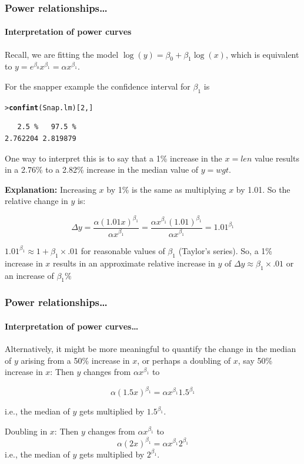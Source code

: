 \documentclass{beamer}\usepackage[]{graphicx}\usepackage[]{xcolor}
\makeatletter
\newcommand{\hlnum}[1]{\textcolor[rgb]{0.686,0.059,0.569}{#1}}%
\newcommand{\hlstd}[1]{\textcolor[rgb]{0.345,0.345,0.345}{#1}}%
\newcommand{\hlkwd}[1]{\textcolor[rgb]{0.737,0.353,0.396}{\textbf{#1}}}%
\newenvironment{kframe}{%
 \def\at@end@of@kframe{}%
 \ifinner\ifhmode%
  \def\at@end@of@kframe{\end{minipage}}%
  \begin{minipage}{\columnwidth}%
 \fi\fi%
 \def\FrameCommand##1{\hskip\@totalleftmargin \hskip-\fboxsep
 \colorbox{shadecolor}{##1}\hskip-\fboxsep
     \hskip-\linewidth \hskip-\@totalleftmargin \hskip\columnwidth}%
 \MakeFramed {\advance\hsize-\width
   \@totalleftmargin\z@ \linewidth\hsize
   \@setminipage}}%
 {\par\unskip\endMakeFramed%
 \at@end@of@kframe}
\newenvironment{knitrout}{}{} %
\makeatother
\begin{document}
\begin{frame}[fragile]
\frametitle{Power relationships\ldots}
\framesubtitle{Interpretation of power curves}
Recall, we are fitting the model 
$\log(y)=\beta_0+\beta_1 \log(x)$, which is equivalent to
$y=e^{\beta_0}x^{\beta_1} =\alpha x^{\beta_1}$.

\medskip

For the snapper example the confidence interval for $\beta_1$ is 
\begin{knitrout}\scriptsize
{}\color{fgcolor}\begin{kframe}
\begin{alltt}
\hlstd{> }\hlkwd{confint}\hlstd{(Snap.lm)[}\hlnum{2}\hlstd{,]}
\end{alltt}
\begin{verbatim}
   2.5 %   97.5 % 
2.762204 2.819879 
\end{verbatim}
\end{kframe}
\end{knitrout}

One way to interpret this is to say that a 1\% increase in the $x=len$ value 
results in a 2.76\% to a 2.82\% increase in the median value of $y=wgt$.

\medskip

\textbf{Explanation:} Increasing $x$ by 1\% is the same as multiplying $x$ by 1.01.
So the  relative change in $y$ is: 

\vspace{-0.5em}

\[
\Delta y=\frac{\alpha (1.01x)^{\beta_1}}{\alpha x^{\beta_1}}
=\frac{\alpha x^{\beta_1}(1.01)^{\beta_1}}{\alpha x^{\beta_1}}=1.01^{\beta_1}
\]

\vspace{-1em}

$1.01^{\beta_1}\approx 1+\beta_1\times .01$ for reasonable values of $\beta_1$  (Taylor's series).
So, a 1\% increase in $x$ results in an approximate relative increase in $y$ of  $\Delta y\approx \beta_1\times .01$ or an increase of $\beta_1\%$
\end{frame}


\begin{frame}[fragile]
\frametitle{Power relationships\ldots}
\framesubtitle{Interpretation of power curves\ldots}
Alternatively, it might be more meaningful to quantify the change in the median of $y$ arising from a 50\% increase in $x$, or perhaps a doubling of $x$, say 50\% increase in $x$: Then $y$ changes from $\alpha x^{\beta_1}$ to 

\[ \alpha (1.5x)^{\beta_1} =  \alpha x^{\beta_1} 1.5^{\beta_1} \]

i.e., the median of $y$ gets multiplied by $1.5^{\beta_1}$. \\

\bigskip

Doubling in $x$: Then $y$ changes from $\alpha x^{\beta_1}$ to 
\[ \alpha (2x)^{\beta_1} =  \alpha x^{\beta_1} 2^{\beta_1} \]
i.e., the median of $y$ gets multiplied by $2^{\beta_1}$.
\end{frame}
\end{document}
